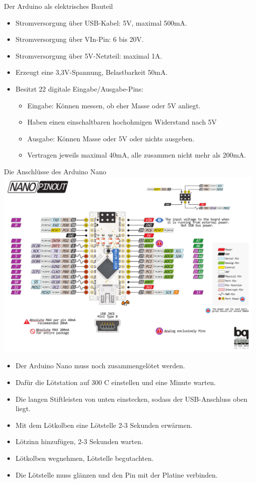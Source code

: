 \documentclass[12pt]{beamer}
\begin{document}
\begin{frame}{Der Arduino als elektrisches Bauteil}
\begin{itemize}
\item Stromversorgung über USB-Kabel: 5V, maximal 500mA.
\item Stromversorgung über VIn-Pin: 6 bis 20V.
\item Stromversorgung über 5V-Netzteil: maximal 1A.
\item Erzeugt eine 3,3V-Spannung, Belastbarkeit 50mA.
\item Besitzt 22 digitale Eingabe/Ausgabe-Pins:
\begin{itemize}
\item Eingabe: Können messen, ob eher Masse oder 5V anliegt.
\item Haben einen einschaltbaren hochohmigen Widerstand nach 5V
\item Ausgabe: Können Masse oder 5V oder nichts ausgeben.
\item Vertragen jeweils maximal 40mA, alle zusammen nicht mehr als 200mA.
\end{itemize}
\end{itemize}
\end{frame}

\begin{frame}{Die Anschlüsse des Arduino Nano}
\includegraphics[scale=0.3]{Bilder/nano_pinout.pdf}
\end{frame}

\begin{itemize}
\item Der Arduino Nano muss noch zusammengelötet werden.
\item Dafür die Lötstation auf 300 C einstellen und eine Minute warten.
\item Die langen Stiftleisten von unten einstecken, sodass der USB-Anschluss oben liegt.
\item Mit dem Lötkolben eine Lötstelle 2-3 Sekunden erwärmen.
\item Lötzinn hinzufügen, 2-3 Sekunden warten.
\item Lötkolben wegnehmen, Lötstelle begutachten.
\item Die Lötstelle muss glänzen und den Pin mit der Platine verbinden.
\end{itemize}
\end{document}
